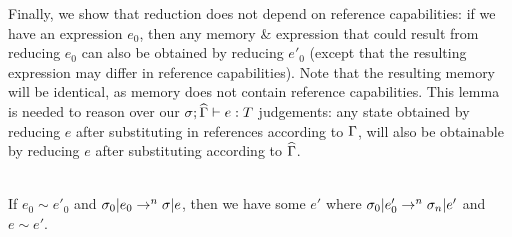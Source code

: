 Finally, we show that reduction does not depend on reference capabilities:
if we have an expression $e_0$, then any memory \& expression that could result from reducing $e_0$ 
can also be obtained by reducing $e'_0$ (except that the resulting expression may differ in reference capabilities).
Note that the resulting memory will be identical, as memory does not contain reference capabilities.
This lemma is needed to reason over our $\ty[\s][\demut{\G}]{e}{T}$ judgements: any state obtained by reducing $e$ after substituting in references according to $\Gamma$, will also be obtainable by reducing $e$ after substituting according to $\widehat{\Gamma}$.

\SS\begin{Lemma}[Bisimulation]\ \\
	\indent If $e_0\sim e'_0$ and $\sigma_0|e_0\rightarrow^n\sigma|e$, then we have
	some $e'$ where $\sigma_0|e'_0\rightarrow^n\sigma_n|e'$ and $e\sim e'$.
\end{Lemma}
